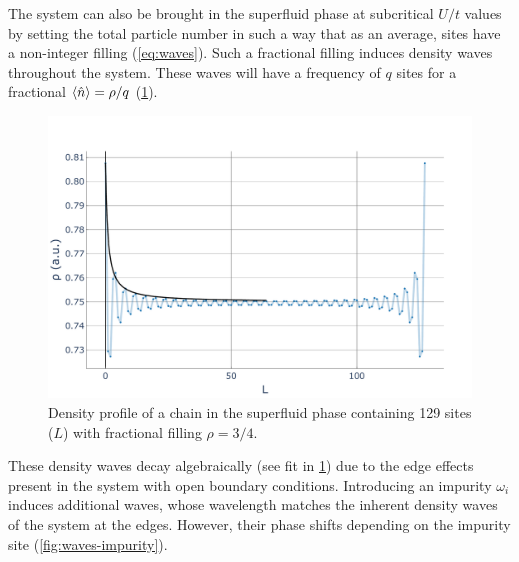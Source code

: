 \documentclass[twoside,twocolumn,9pt]{article}
\begin{document}
The system can also be brought in the superfluid phase at subcritical $U/t$ values by setting the total particle number in such a way that as an average, sites have a non-integer filling (\cref{eq:waves}). Such a fractional filling induces density waves throughout the system. These waves will have a frequency of $q$ sites for a fractional $\expval{\hat{n}} = \rho/q$ (\cref{fig:waves}). 
\begin{center}
  \begin{figure}
      \includegraphics[width=\linewidth]{../code/figures/Density-profiles-fractional-density.pdf}
      \caption{Density profile of a chain in the superfluid phase containing 129 sites ($L$) with fractional filling $\rho=3/4$.}
      \label{fig:waves}
  \end{figure}
\end{center}
These density waves decay algebraically (see fit in \cref{fig:waves}) due to the edge effects present in the system with open boundary conditions. Introducing an impurity $\omega_i$ induces additional waves, whose wavelength  matches the inherent density waves of the system at the edges. However, their phase shifts depending on the impurity site  (\cref{fig:waves-impurity}). 
\end{document}
